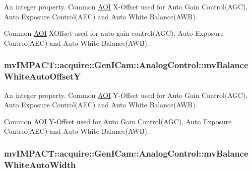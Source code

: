 An integer property. Common \hyperlink{struct_a_o_i}{A\+O\+I} X-\/\+Offset used for Auto Gain Control(\+A\+G\+C), Auto Exposure Control(\+A\+E\+C) and Auto White Balance(\+A\+W\+B). 

Common \hyperlink{struct_a_o_i}{A\+O\+I} X\+Offset used for auto gain control(\+A\+G\+C), Auto Exposure Control(\+A\+E\+C) and Auto White Balance(\+A\+W\+B). \hypertarget{classmv_i_m_p_a_c_t_1_1acquire_1_1_gen_i_cam_1_1_analog_control_a0ff35c0603271ac43d1e26f1ffdfacef}{
\subsubsection[{mv\+Balance\+White\+Auto\+Offset\+Y}]{ mv\+I\+M\+P\+A\+C\+T\+::acquire\+::\+Gen\+I\+Cam\+::\+Analog\+Control\+::mv\+Balance\+White\+Auto\+Offset\+Y}}\label{classmv_i_m_p_a_c_t_1_1acquire_1_1_gen_i_cam_1_1_analog_control_a0ff35c0603271ac43d1e26f1ffdfacef}


An integer property. Common \hyperlink{struct_a_o_i}{A\+O\+I} Y-\/\+Offset used for Auto Gain Control(\+A\+G\+C), Auto Exposure Control(\+A\+E\+C) and Auto White Balance(\+A\+W\+B). 

Common \hyperlink{struct_a_o_i}{A\+O\+I} Y-\/\+Offset used for Auto Gain Control(\+A\+G\+C), Auto Exposure Control(\+A\+E\+C) and Auto White Balance(\+A\+W\+B). \hypertarget{classmv_i_m_p_a_c_t_1_1acquire_1_1_gen_i_cam_1_1_analog_control_a338eb6fc0ff578495472aca810623d24}{
\subsubsection[{mv\+Balance\+White\+Auto\+Width}]{ mv\+I\+M\+P\+A\+C\+T\+::acquire\+::\+Gen\+I\+Cam\+::\+Analog\+Control\+::mv\+Balance\+White\+Auto\+Width}}\label{classmv_i_m_p_a_c_t_1_1acquire_1_1_gen_i_cam_1_1_analog_control_a338eb6fc0ff578495472aca810623d24}


